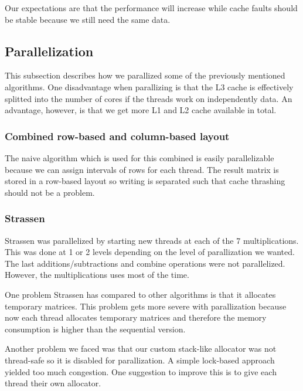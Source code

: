 Our expectations are that the performance will increase while cache faults should be stable because we still need the same data. 

\subsection{Parallelization}

This subsection describes how we parallized some of the previously mentioned algorithms. One disadvantage when parallizing is that the L3 cache is effectively splitted into the number of cores if the threads work on independently data. An advantage, however, is that we get more L1 and L2 cache available in total.


\subsubsection{Combined row-based and column-based layout}

The naive algorithm which is used for this combined is easily parallelizable because we can assign intervals of rows for each thread. The result matrix is stored in a row-based layout so writing is separated such that cache thrashing should not be a problem.

\subsubsection{Strassen}

Strassen was parallelized by starting new threads at each of the 7 multiplications. This was done at 1 or 2 levels depending on the level of parallization we wanted. The last additions/subtractions and combine operations were not parallelized. However, the multiplications uses most of the time.

One problem Strassen has compared to other algorithms is that it allocates temporary matrices. This problem gets more severe with parallization because now each thread allocates temporary matrices and therefore the memory consumption is higher than the sequential version.

Another problem we faced was that our custom stack-like allocator was not thread-safe so it is disabled for parallization. A simple lock-based approach yielded too much congestion. One suggestion to improve this is to give each thread their own allocator.
